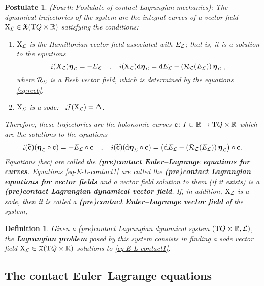 \documentclass[12pt]{report}
\newtheorem{definition}[teor]{Definition}
\newtheorem{pos}[teor]{Postulate}
\def\beq{\begin{equation}}
\def\eeq{\end{equation}}
\def\ben{\begin{enumerate}}
\def\een{\end{enumerate}}
\def\vf{\mathfrak X}
\def\Lag{{\cal L}}
\def\d{{\rm d}}
\def\Real{\mathbb{R}}
\def\bmeta{\mbox{\boldmath $\eta$}}
\def\X{{\rm X}}
\def\Tan{{\rm T}}
\def\inn{\mathop{i}\nolimits}
\newcommand{\Reeb}{\mathcal{R}}
\begin{document}
\begin{pos}
{\rm (Fourth Postulate of contact Lagrangian mechanics\/)}:
The dynamical trajectories of the system are the integral curves
of a vector field $\X_\Lag\in \vf(\Tan Q\times\Real)$ satisfying the conditions:
\ben
\item
$\X_\Lag$ is the Hamiltonian vector field associated with $E_\Lag$;
that is, it is a solution to the equations
\beq
\label{eq-E-L-contact1}
\inn(X_\Lag)\bmeta_\Lag=-E_\Lag \quad,\quad
\inn(\X_\Lag)\d \bmeta_\Lag=\d E_\Lag-(\Reeb_\Lag(E_\Lag))\,\bmeta_\Lag \ ,
\eeq
where $\Reeb_\Lag$ is a Reeb vector field, which is determined by the equations \eqref{eq:reeb}.
\item
$\X_\Lag$ is a {\sc sode}:
\ ${\cal J}(\X_\Lag)=\Delta$.
\een
Therefore, these trajectories are the holonomic curves 
${\bf c}\colon I\subset\Real\to\Tan Q\times\Real$
which are the solutions to the equations
\beq
\inn({\bf\widetilde c})(\bmeta_\Lag\circ {\bf c}) = - E_\Lag\circ{\bf c} \quad  , \quad
\inn({\bf\widetilde c})(\d\bmeta_\Lag\circ {\bf  c})=\big(\d E_\Lag - (\Reeb_\Lag(E_\Lag))\,\bmeta_\Lag\big)\circ{\bf c} .
\label{hec}
\eeq
Equations \eqref{hec} are called the
{\sl \textbf{(pre)contact Euler--Lagrange equations for curves}}.
Equations \eqref{eq-E-L-contact1} are called the
{\sl \textbf{(pre)contact Lagrangian equations for vector fields}} and
a vector field solution to them (if it exists) is a
{\sl \textbf{(pre)contact Lagrangian dynamical vector field}}.
If, in addition, $\X_\Lag$ is a {\sc sode}, then
it is called a {\sl \textbf{(pre)contact Euler--Lagrange vector field}} of the system, 
\end{pos}

\begin{definition}
Given a (pre)contact Lagrangian dynamical system $(\Tan Q\times\Real,\Lag)$, 
the {\sl \textbf{Lagrangian problem}} posed by this system
consists in finding a {\sc sode} vector field $\X_\Lag\in\vf(\Tan Q\times\Real)$
solutions to \eqref{eq-E-L-contact1}.
\end{definition}


\subsection{The contact Euler--Lagrange equations}
\end{document}
